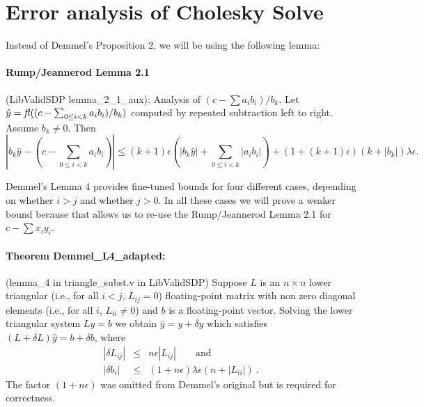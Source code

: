 \documentclass[a4paper]{article}
\begin{document}
\section{Error analysis of Cholesky Solve}

Instead of Demmel's Proposition 2, we will be using
the following lemma:

\paragraph*{Rump/Jeannerod Lemma 2.1} (LibValidSDP lemma\_2\_1\_aux): Analysis of $(c-\sum a_i b_i)/b_k$.
  \newline
  Let $\hat{y} = \mathit{fl}((c-\sum_{0\le i<k} a_i b_i)/b_k)$ computed by repeated subtraction left to right.  Assume $b_k\not= 0$. Then
\begin{equation}\label{lemma_2_1}\tag{lemma2.1}
  |b_k \hat{y} - (c-\sum_{0 \le i<k}a_i b_i)| \le (k+1)\epsilon \left(|b_k\hat{y}| + \sum_{0\le i < k}|a_ib_i|\right)
  + (1+(k+1)\epsilon)(k+|b_k|)\lambda\epsilon.
  \end{equation}
  
Demmel's Lemma 4 provides fine-tuned bounds for four different cases,
depending on whether $i>j$ and whether $j>0$.
In all these cases we will prove a
weaker bound because that allows us to
re-use the Rump/Jeannerod Lemma 2.1 for $c - \sum x_i y_i$.

\paragraph*{Theorem Demmel\_L4\_adapted:} (lemma\_4 in triangle\_subst.v in LibValidSDP)
Suppose $L$ is an $n \times n$ lower triangular (i.e., for all $i < j$,
$L_{ij} = 0$) floating-point matrix with non zero diagonal elements
(i.e., for all $i$, $L_{ii} \neq 0$) and $b$ is a floating-point vector.
Solving the lower triangular system $Ly = b$ we obtain $\hat{y}=y+\delta y$
which satisfies $(L+\delta L)\hat{y}= b + \delta b$, where
\begin{equation}\tag{demmel\_lemma\_4}
  \begin{array}{rcl}
  |\delta L_{ij}| & \le & n\epsilon|L_{ij}|\qquad\mathrm{and} \\
  |\delta b_i | & \le & (1+n\epsilon)\lambda \epsilon \left(n + |L_{ii}|\right)~.
  \end{array}
\end{equation}
\noindent The factor $(1+n\epsilon)$ was omitted from Demmel's original but is required for correctness.
\end{document}
